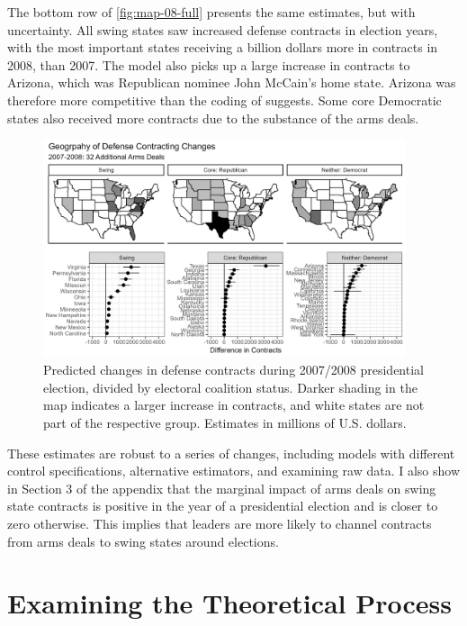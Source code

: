 \documentclass[12pt]{article}
\begin{document}
The bottom row of \autoref{fig:map-08-full} presents the same estimates, but with uncertainty. 
All swing states saw increased defense contracts in election years, with the most important states receiving a billion dollars more in contracts in 2008, than 2007.
The model also picks up a large increase in contracts to Arizona, which was Republican nominee John McCain's home state.
Arizona was therefore more competitive than the coding of \citet{KrinerReeves2015} suggests. 
Some core Democratic states also received more contracts due to the substance of the arms deals. 


\begin{figure}[htpb]
	\centering
		\includegraphics[width=0.95\textwidth]{../figures/map-08-full.png}
	\caption{Predicted changes in defense contracts during 2007/2008 presidential election, divided by electoral coalition status. Darker shading in the map indicates a larger increase in contracts, and white states are not part of the respective group. Estimates in millions of U.S. dollars.}
	\label{fig:map-08-full}
\end{figure}


These estimates are robust to a series of changes, including models with different control specifications, alternative estimators, and examining raw data.
I also show in Section 3 of the appendix that the marginal impact of arms deals on swing state contracts is positive in the year of a presidential election and is closer to zero otherwise.
This implies that leaders are more likely to channel contracts from arms deals to swing states around elections. 


\section{Examining the Theoretical Process}
\end{document}
